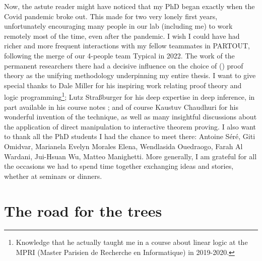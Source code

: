 Now, the astute reader might have noticed that my PhD began exactly when the Covid pandemic broke out. This made for two very lonely first years, unfortunately encouraging many people in our lab (including me) to work remotely most of the time, even after the pandemic. I wish I could have had richer and more frequent interactions with my fellow teammates in PARTOUT, following the merge of our 4-people team Typical in 2022. The work of the permanent researchers there had a decisive influence on the choice of () proof theory as the unifying methodology underpinning my entire thesis. I want to give special thanks to Dale Miller for his inspiring work relating proof theory and logic programming\footnote{Knowledge that he actually taught me in a course about linear logic at the MPRI (Master Parisien de Recherche en Informatique) in 2019-2020.}; Lutz Straßburger for his deep expertise in deep inference, in part available in his course notes \cite{tubella:hal-02390267}; and of course Kaustuv Chaudhuri for his wonderful invention of the  technique, as well as many insightful discussions about the application of direct manipulation to interactive theorem proving. I also want to thank all the PhD students I had the chance to meet there: Antoine Séré, Giti Omidvar, Marianela Evelyn Morales Elena, Wendlasida Ouedraogo, Farah Al Wardani, Jui-Hsuan Wu, Matteo Manighetti. More generally, I am grateful for all the occasions we had to spend time together exchanging ideas and stories, whether at seminars or dinners.

\section*{The road for the trees}


